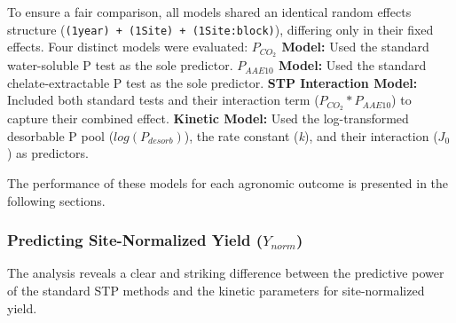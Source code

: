 \documentclass[
  a4paper,
]{article}
\begin{document}
To ensure a fair comparison, all models shared an identical random
effects structure
(\texttt{(1\textbar{}year)\ +\ (1\textbar{}Site)\ +\ (1\textbar{}Site:block)}),
differing only in their fixed effects. Four distinct models were
evaluated: \textbf{\(P_{CO_2}\) Model:} Used the standard water-soluble
P test as the sole predictor. \textbf{\(P_{AAE10}\) Model:} Used the
standard chelate-extractable P test as the sole predictor. \textbf{STP
Interaction Model:} Included both standard tests and their interaction
term (\(P_{CO_2} * P_{AAE10}\)) to capture their combined effect.
\textbf{Kinetic Model:} Used the log-transformed desorbable P pool
(\(log(P_{desorb})\)), the rate constant (\emph{k}), and their
interaction (\(J_0\)) as predictors.

The performance of these models for each agronomic outcome is presented
in the following sections.

\subsubsection{\texorpdfstring{Predicting Site-Normalized Yield
(\(Y_{norm}\))}{Predicting Site-Normalized Yield (Y\_\{norm\})}}\label{predicting-site-normalized-yield-y_norm}

The analysis reveals a clear and striking difference between the
predictive power of the standard STP methods and the kinetic parameters
for site-normalized yield.
\end{document}
